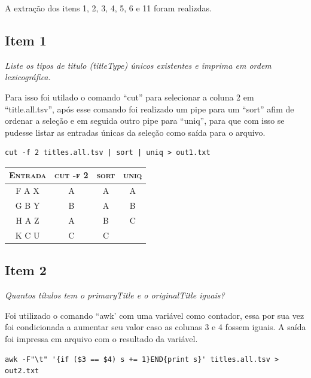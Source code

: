 \documentclass[12pt]{article}
\begin{document}
A extração dos itens 1, 2, 3, 4, 5, 6 e 11 foram realizdas.

\subsection*{Item 1}

\noindent\emph{Liste os tipos de titulo (titleType) únicos existentes e imprima em ordem lexicográfica.}
\vspace{1em}

Para isso foi utilado o comando ``cut'' para selecionar a coluna 2 em ``title.all.tsv'', após esse comando foi realizado um pipe para um ``sort'' afim de ordenar a seleção e em seguida outro pipe para ``uniq'', para que com isso se pudesse listar as entradas únicas da seleção como saída para o arquivo.

\begin{verbatim}
cut -f 2 titles.all.tsv | sort | uniq > out1.txt
\end{verbatim}

\begin{table}[!h]
    \begin{tabular}{ c c c c }
        \textsc{Entrada} & \textsc{cut -f 2} & \textsc{sort} & \textsc{uniq} \\ 
        \hline
        F A X & A & A & A \\ 
        G B Y & B & A & B \\
        H A Z & A & B & C \\
        K C U & C & C &   \\
    \end{tabular}
\end{table}

\subsection*{Item 2}

\noindent\emph{Quantos títulos tem o primaryTitle e o originalTitle iguais?}
\vspace{1em}

Foi utilizado o comando ``awk' com uma variável como contador, essa por sua vez foi condicionada a aumentar seu valor caso as colunas 3 e 4 fossem iguais. A saída foi impressa em arquivo com o resultado da variável.

\begin{verbatim}
awk -F"\t" '{if ($3 == $4) s += 1}END{print s}' titles.all.tsv > out2.txt
\end{verbatim}
\end{document}
